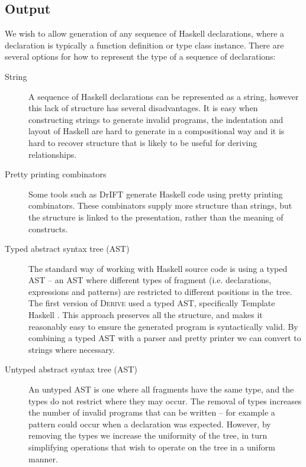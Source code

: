 \documentclass[preprint,draft]{sigplanconf}
\newcommand{\derive}{\textsc{Derive}}
\begin{document}
\subsection{Output}

We wish to allow generation of any sequence of Haskell declarations, where a declaration is typically a function definition or type class instance. There are several options for how to represent the type of a sequence of declarations:

\begin{description}
\item[String] A sequence of Haskell declarations can be represented as a string, however this lack of structure has several disadvantages. It is easy when constructing strings to generate invalid programs, the indentation and layout of Haskell are hard to generate in a compositional way and it is hard to recover structure that is likely to be useful for deriving relationships.
\item[Pretty printing combinators] Some tools such as DrIFT \cite{drift} generate Haskell code using pretty printing combinators. These combinators supply more structure than strings, but the structure is linked to the presentation, rather than the meaning of constructs.
\item[Typed abstract syntax tree (AST)] The standard way of working with Haskell source code is using a typed AST -- an AST where different types of fragment (i.e. declarations, expressions and patterns) are restricted to different positions in the tree. The first version of \derive{} used a typed AST, specifically Template Haskell \cite{template_haskell}. This approach preserves all the structure, and makes it reasonably easy to ensure the generated program is syntactically valid. By combining a typed AST with a parser and pretty printer we can convert to strings where necessary.
\item[Untyped abstract syntax tree (AST)] An untyped AST is one where all fragments have the same type, and the types do not restrict where they may occur. The removal of types increases the number of invalid programs that can be written -- for example a pattern could occur when a declaration was expected. However, by removing the types we increase the uniformity of the tree, in turn simplifying operations that wish to operate on the tree in a uniform manner.
\end{description}
\end{document}
